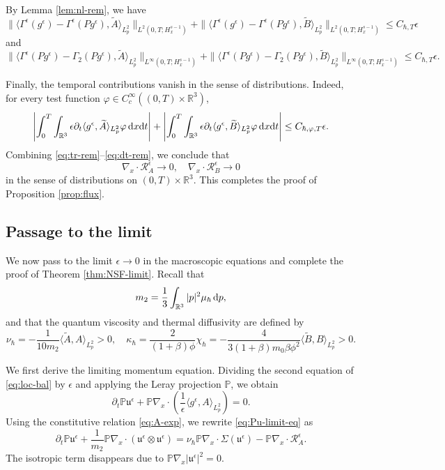 \documentclass[10pt,reqno]{amsart}
\numberwithin{equation}{section}
\newcommand{\lt}{\left}
\newcommand{\rt}{\right}
\newcommand{\lal}{\langle}
\newcommand{\ral}{\rangle}
\newcommand{\mP}{\mathbb{P}}
\newcommand{\mR}{\mathbb{R}}
\newcommand{\mfu}{\mathfrak{u}}
\newcommand{\intr}{\int_{\mR^3}}
\newcommand{\R}{\mathbb R}
\newcommand{\bq}{\begin{equation}}
\newcommand{\eq}{\end{equation}}
\newcommand{\pa}{\partial}
\newcommand{\calR}{\mathcal R}
\newcommand{\rdx}{\textnormal{d}x}
\newcommand{\rdt}{\textnormal{d}t}
\newcommand{\rdp}{\textnormal{d}p}
\begin{document}
By Lemma \ref{lem:nl-rem}, we have
\[
 \| \lal \Gamma^\epsilon ( g^\epsilon ) - \Gamma^\epsilon ( P g^\epsilon ), \widetilde A  \ral_{L^2_p} \|_{L^2(0,T;H^{s-1}_x)}  + \| \lal \Gamma^\epsilon ( g^\epsilon ) - \Gamma^\epsilon ( P g^\epsilon ), \widetilde B  \ral_{L^2_p} \|_{L^2(0,T;H^{s-1}_x)} \le C_{\hbar,T} \epsilon
\]
and
\[
\| \lal \Gamma^\epsilon ( P g^\epsilon ) - \Gamma_2  ( P g^\epsilon), \widetilde A  \ral_{L^2_p} \|_{L^\infty(0,T;H^{s-1}_x)}  + \| \lal \Gamma^\epsilon ( P g^\epsilon ) - \Gamma_2  ( P g^\epsilon), \widetilde B  \ral_{L^2_p} \|_{L^\infty(0,T;H^{s-1}_x)} \le C_{\hbar,T} \epsilon.
\]
 


Finally, the temporal contributions vanish in the sense of distributions. Indeed, for every test function $\varphi\in C_c^\infty((0,T)\times\R^3)$,
\bq\label{eq:dt-rem}
\lt|\int_0^T\intr \epsilon\pa_t\lal g^\epsilon,\widetilde A \ral_{L^2_p}\varphi\,\rdx\rdt\rt|+\lt|\int_0^T\intr \epsilon\pa_t\lal g^\epsilon,\widetilde B \ral_{L^2_p}\varphi\,\rdx\rdt\rt|\le C_{\hbar,\varphi,T}\epsilon.
\eq
Combining \eqref{eq:tr-rem}--\eqref{eq:dt-rem}, we conclude that
\[
\nabla_x\cdot\calR_A^\epsilon\to0, \quad \nabla_x\cdot\calR_B^\epsilon\to0
\]
in the sense of distributions on $(0,T)\times\R^3$. This completes the proof of Proposition \ref{prop:flux}.

 
 
 
 
%
%
%
%
%
%
%
%
%
%
\subsection{Passage to the limit}


We now pass to the limit $\epsilon\to0$ in the macroscopic equations and complete the proof of Theorem \ref{thm:NSF-limit}. Recall that
\[
m_2 =\frac{1}{3}\intr |p|^2\mu_\hbar\,\rdp,
\]
and that the quantum viscosity and thermal diffusivity are defined by
\[
\nu_\hbar=-\frac{1}{10m_2 }\lal\widetilde A ,A \ral_{L^2_p}>0,
\quad
\kappa_\hbar=\frac{2}{(1+\beta)\phi}\chi_\hbar = -\frac{4}{3(1+\beta )m_0\beta\phi ^2}\lal\widetilde B ,B \ral_{L^2_p}>0.
\]

We first derive the limiting momentum equation. Dividing the second equation of \eqref{eq:loc-bal} by $\epsilon$ and applying the Leray projection $\mP$, we obtain
\bq\label{eq:Pu-limit-eq}
\pa_t\mP\mfu^\epsilon+\mP\nabla_x\cdot\lt(\frac{1}{\epsilon}\lal g^\epsilon,A \ral_{L^2_p}\rt)=0.
\eq
Using the constitutive relation \eqref{eq:A-exp}, we rewrite \eqref{eq:Pu-limit-eq} as
\bq\label{eq:Pu-rew}
\pa_t\mP\mfu^\epsilon+\frac{1}{m_2 }\mP\nabla_x\cdot\lt(\mfu^\epsilon\otimes\mfu^\epsilon\rt)
=\nu_\hbar\mP\nabla_x\cdot\Sigma(\mfu^\epsilon)-\mP\nabla_x\cdot\calR_A^\epsilon.
\eq
The isotropic term disappears due to $\mP\nabla_x|\mfu^\epsilon|^2=0$.
\end{document}
